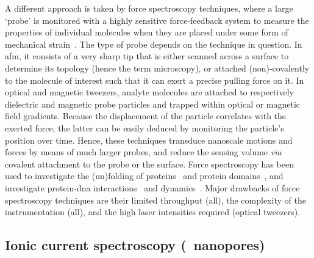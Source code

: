 A different approach is taken by force spectroscopy techniques, where a large `probe' is monitored with a
highly sensitive force-feedback system to measure the properties of individual molecules when they are placed
under some form of mechanical strain~\cite{Neuman-2008}. The type of probe depends on the technique in
question. In \gls{afm}, it consists of a very sharp tip that is either scanned across a surface to determine
its topology (hence the term microscopy), or attached (non)-covalently to the molecule of interest such that
it can exert a precise pulling force on it. In optical and magnetic tweezers, analyte molecules are attached
to respectively dielectric and magnetic probe particles and trapped within optical or magnetic field
gradients. Because the displacement of the particle correlates with the exerted force, the latter can be
easily deduced by monitoring the particle's position over time. Hence, these techniques transduce nanoscale
motions and forces by means of much larger probes, and reduce the sensing volume \textit{via} covalent
attachment to the probe or the surface. Force spectroscopy has been used to investigate the (un)folding of
proteins~\cite{Bustamante-2020,Jagannathan-2013} and protein domains~\cite{Rief-1997,Kellermayer-1997}, and
investigate protein-\gls{dna} interactions~\cite{Abbondanzieri-2005,Shlyakhtenko-2007,Vanderlinden-2019} and
dynamics~\cite{Lyubchenko-2018,Brouns-2018}. Major drawbacks of force spectroscopy techniques are their
limited throughput (all), the complexity of the instrumentation (all), and the high laser intensities required
(optical tweezers).


\subsection{Ionic current spectroscopy (\ie~nanopores)}
%

